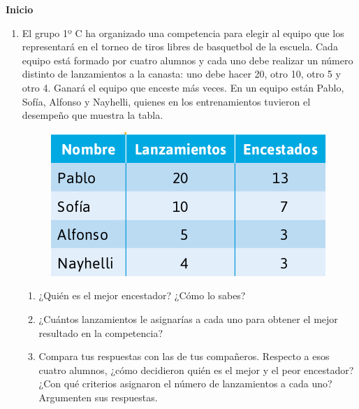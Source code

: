\documentclass[11pt]{book}
\begin{document}
\begin{boxK}
  \begin{center}\textbf{Inicio}\end{center}
  \begin{enumerate}
    \item El grupo 1º C ha organizado una competencia para elegir al equipo que los
          representará en el torneo de tiros libres de basquetbol de la escuela. Cada
          equipo está formado por cuatro alumnos y cada uno debe realizar un número distinto
          de lanzamientos a la canasta: uno debe hacer 20, otro 10, otro 5 y
          otro 4. Ganará el equipo que enceste más veces.
          En un equipo están Pablo, Sofía, Alfonso y Nayhelli, quienes en los entrenamientos
          tuvieron el desempeño que muestra la tabla.
          \begin{figure}[H]
            \centering
            \includegraphics[width=0.4\linewidth]{tabla_lanzamientos.png}
            \label{fig:tabla_lanzamientos}
          \end{figure}
          \begin{enumerate}
            \item ¿Quién es el mejor encestador? ¿Cómo lo sabes?
            \item ¿Cuántos lanzamientos le asignarías a cada uno para obtener el mejor resultado en la competencia?
            \item Compara tus respuestas con las de tus compañeros. Respecto a
                  esos cuatro alumnos, ¿cómo decidieron quién es el mejor y el
                  peor encestador? ¿Con qué criterios asignaron el número de
                  lanzamientos a cada uno? Argumenten sus respuestas.
          \end{enumerate}

  \end{enumerate}
\end{boxK}
\end{document}
